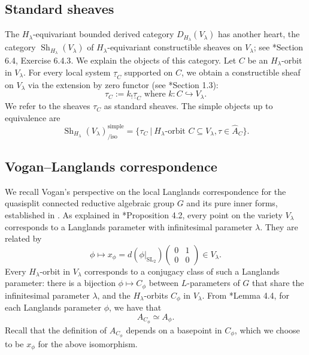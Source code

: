 \documentclass[11pt,letterpaper]{amsart}
\newcommand{\SL}{\mathrm{SL}}
\newcommand{\irrepdual}[1]{\widehat{#1}}
\newcommand{\locsys}[2]{\underline{#1}_{#2}}
\newcommand{\stsh}[2]{{#1}_{#2}}
\renewcommand{\1}{\mathbbm{1}}
\numberwithin{equation}{section}
\begin{document}
{\subsection{Standard sheaves}\label{subsec: standards sheaves} The $H_\lambda$-equivariant bounded derived category $D_{H_\lambda}(V_\lambda)$ has another heart, the category $\operatorname{Sh}_{H_\lambda}(V_\lambda)$ of $H_\lambda$-equivariant constructible sheaves on $V_\lambda$; see \cite{Ach21}*{Section 6.4, Exercise 6.4.3}. We explain the objects of this category. Let $C$ be an $H_\lambda$-orbit in $V_\lambda$. For every local system $\locsys{\tau}{C}$ supported on $C$, we obtain a constructible sheaf on $V_\lambda$ via the extension by zero functor (see \cite{Ach21}*{Section 1.3}):
\begin{equation}
    \stsh{\tau}{C} :=k_!\locsys{\tau}{C} \text{ where } k:C \hookrightarrow V_\lambda.
\end{equation} 
We refer to the sheaves $\stsh{\tau}{C}$ as standard sheaves. The simple objects up to equivalence are
\begin{equation}\label{eq: standard sheaves classified}
    \operatorname{Sh}_{H_\lambda}(V_\lambda)_{\text{/iso}}^{\text{simple}}=\{\stsh{\tau}{C}~\vert ~ H_\lambda \text{-orbit }C \subseteq V_\lambda, \tau \in \irrepdual{A}_C \}.
\end{equation}


\subsection{Vogan--Langlands correspondence}\label{Vogan--Langlands correspondence}
We recall Vogan's perspective on the local Langlands correspondence for the quasisplit connected reductive algebraic group $G$ and its pure inner forms, established in \cite{Vog93}. As explained in \cite{CFMMX22}*{Proposition 4.2}, every point on the variety $V_\lambda$ corresponds to a Langlands parameter with infinitesimal parameter $\lambda$. They are related by 
\[ \phi \mapsto x_{\phi}=d(\phi|_{\SL_2})\begin{pmatrix}
    0 & 1\\0& 0
\end{pmatrix} \in V_{\lambda}. \]
Every $H_\lambda$-orbit in $V_\lambda$ corresponds to a conjugacy class of such a Langlands parameter: there is a bijection $\phi \mapsto C_{\phi}$ between $L$-parameters of $G$ that share the infinitesimal parameter $\lambda$, and the $H_{\lambda}$-orbits $C_{\phi}$ in $V_{\lambda}$. 
From
\cite{CFMMX22}*{Lemma 4.4}, for each Langlands parameter $\phi$,
we have that \begin{equation}\label{eqn: equivalence of component group and eq fund group}
    A_{C_{\phi}}\simeq A_{\phi}.
\end{equation}
Recall that the definition of $A_{C_{\phi}}$ depends on a basepoint in $C_{\phi}$, which we choose to be $x_{\phi}$ for the above isomorphism.

}
\end{document}
